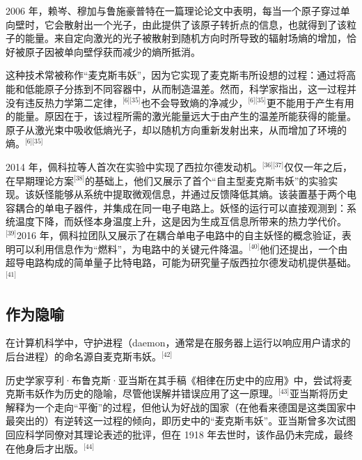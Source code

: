 2006 年，赖岑、穆加与鲁施豪普特在一篇理论论文中表明，每当一个原子穿过单向壁时，它会散射出一个光子，由此提供了该原子转折点的信息，也就得到了该粒子的能量。来自定向激光的光子被散射到随机方向时所导致的辐射场熵的增加，恰好被原子因被单向壁俘获而减少的熵所抵消。

这种技术常被称作“麦克斯韦妖”，因为它实现了麦克斯韦所设想的过程：通过将高能和低能原子分拣到不同容器中，从而制造温差。然而，科学家指出，这一过程并没有违反热力学第二定律，\(^\text{[6][35]}\)也不会导致熵的净减少，\(^\text{[6][35]}\)更不能用于产生有用的能量。原因在于，该过程所需的激光能量远大于由产生的温差所能获得的能量。原子从激光束中吸收低熵光子，却以随机方向重新发射出来，从而增加了环境的熵。\(^\text{[6][35]}\)

2014 年，佩科拉等人首次在实验中实现了西拉尔德发动机。\(^\text{[36][37]}\)仅仅一年之后，在早期理论方案\(^\text{[38]}\)的基础上，他们又展示了首个“自主型麦克斯韦妖”的实验实现。该妖怪能够从系统中提取微观信息，并通过反馈降低其熵。该装置基于两个电容耦合的单电子器件，并集成在同一电子电路上。妖怪的运行可以直接观测到：系统温度下降，而妖怪本身温度上升，这是因为生成互信息所带来的热力学代价。\(^\text{[39]}\)2016 年，佩科拉团队又展示了在耦合单电子电路中的自主妖怪的概念验证，表明可以利用信息作为“燃料”，为电路中的关键元件降温。\(^\text{[40]}\)他们还提出，一个由超导电路构成的简单量子比特电路，可能为研究量子版西拉尔德发动机提供基础。\(^\text{[41]}\)
\subsection{作为隐喻}
在计算机科学中，守护进程（daemon，通常是在服务器上运行以响应用户请求的后台进程）的命名源自麦克斯韦妖。\(^\text{[42]}\)

历史学家亨利·布鲁克斯·亚当斯在其手稿《相律在历史中的应用》中，尝试将麦克斯韦妖作为历史的隐喻，尽管他误解并错误应用了这一原理。\(^\text{[43]}\)亚当斯将历史解释为一个走向“平衡”的过程，但他认为好战的国家（在他看来德国是这类国家中最突出的）有逆转这一过程的倾向，即历史中的“麦克斯韦妖”。亚当斯曾多次试图回应科学同僚对其理论表述的批评，但在 1918 年去世时，该作品仍未完成，最终在他身后才出版。\(^\text{[44]}\)
